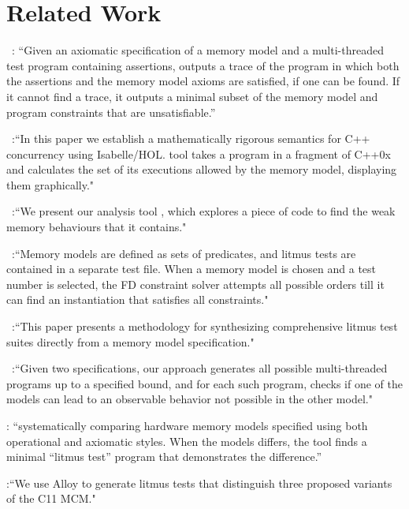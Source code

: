 
\section{Related Work} \label{section:related-work}

\memsat~\cite{MemSAT:PLDI2010}: ``Given an axiomatic specification of a memory model
and a multi-threaded test program containing assertions,
\memsat{} outputs a trace of the program in which both the assertions
and the memory model axioms are satisfied, if one can be found.
If it cannot find a trace, it outputs a minimal subset of the memory model and program constraints
that are unsatisfiable.''

\cppmem~\cite{CppMem:POPL2011}:``In this paper we establish a mathematically rigorous
semantics for C++ concurrency using Isabelle/HOL.
\cppmem{} tool takes a program in a fragment of C++0x 
and calculates the set of its executions 
allowed by the memory model, displaying them graphically."

\herd~\cite{Herd:TOPLAS2014}:``We present our analysis tool \mole{}, 
which explores a piece of code to 
find the weak memory behaviours that it contains."

\nemos~\cite{Nemos:IPDPS2004}:``Memory models are defined as sets of predicates, 
and litmus tests are contained in a separate test file.
When a memory model is chosen and a test number is selected, 
the FD constraint solver attempts all possible orders 
till it can find an instantiation that satisfies all constraints."

~\cite{Suites:ASPLOS2017}:``This paper presents a methodology 
for synthesizing comprehensive litmus test suites 
directly from a memory model specification."

~\cite{Contrasting:CAV2010}:``Given two specifications,
our approach generates all possible multi-threaded programs up to a specified bound, 
and for each such program, checks if one of the models 
can lead to an observable behavior not possible in the other model."

\cite{Contrasting:CAV2010}: ``systematically comparing hardware memory models
specified using both operational and axiomatic styles.
When the models differs, the tool finds a minimal “litmus test”
program that demonstrates the difference.''

\cite{Comparing:POPL2017}:``We use Alloy to generate litmus tests that 
distinguish three proposed variants of the C11 MCM."

